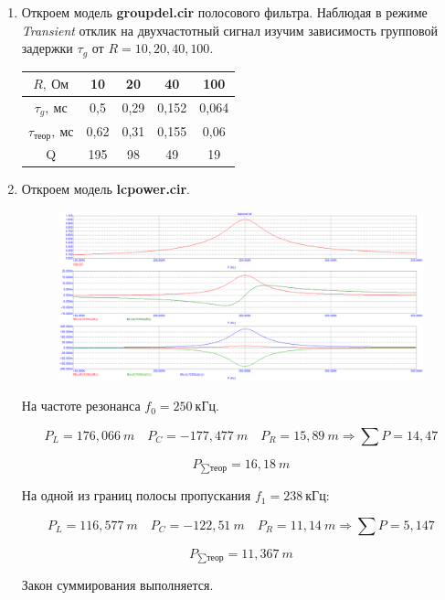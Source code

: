 \documentclass[a4paper, 12pt]{article}%
\begin{document}
\begin{enumerate}
\item Откроем модель \textbf{groupdel.cir} полосового фильтра. Наблюдая в режиме \textit{Transient} отклик на двухчастотный сигнал изучим зависимость групповой задержки $\tau_g$ от $R = 10, 20, 40, 100$.

\begin{center}
\begin{tabular}{|c|c|c|c|c|}
\hline 
$R, \: \textit{Ом}$ & 10 & 20 & 40 & 100 \\ 
\hline 
$\tau_g, \: \textit{мс}$ & 0,5 & 0,29 & 0,152 & 0,064 \\ 
\hline 
$\tau_{\textit{теор}}, \: \textit{мс}$ & 0,62 & 0,31 & 0,155 & 0,06 \\ 
\hline 
Q & 195 & 98 & 49 & 19 \\ 
\hline 
\end{tabular}
\end{center}

\item Откроем модель \textbf{lcpower.cir}.

\begin{figure}[h!]
\centering
\includegraphics[scale=0.4]{lcpower.png}
\label{fig:Image1}
\end{figure} 

На частоте резонанса $f_0 = 250 \: \textit{кГц}$.

\[P_L = 176,066 \: m \quad P_C = -177,477 \: m \quad P_R = 15,89 \: m \Rightarrow \sum P = 14,47\]

\[P_{\sum \textit{теор}} = 16,18 \: m\]

На одной из границ полосы пропускания $f_1 = 238 \: \textit{кГц}$:

\[P_L = 116,577 \: m \quad P_C = -122,51 \: m \quad P_R = 11,14 \: m \Rightarrow \sum P = 5,147\]

\[P_{\sum \textit{теор}} = 11,367 \: m\]

Закон суммирования выполняется.

\end{enumerate}
\end{document}
